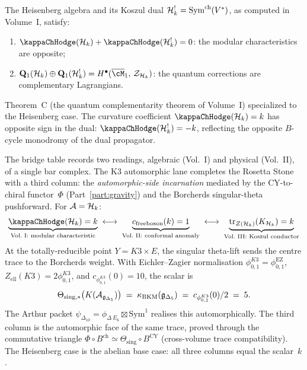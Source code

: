 \begin{proposition}
\label{prop:rosetta-complementarity}
The Heisenberg algebra and its Koszul dual
$\mathcal{H}_k^! = \mathrm{Sym}^{\mathrm{ch}}(V^*)$,
as computed in Volume~I,
satisfy:
\begin{enumerate}[label=\textup{(\roman*)}]
\item $\kappaChHodge(\cH_k) + \kappaChHodge(\cH_k^!) = 0$:
 the modular characteristics are opposite;
\item $\mathbf{Q}_1(\cH_k) \oplus \mathbf{Q}_1(\cH_k^!)
 = H^{\bullet}(\overline{\cM}_1,\, \mathcal{Z}_{\cH_k})$:
 the quantum corrections are complementary Lagrangians.
\end{enumerate}
Theorem~C \textup{(}the quantum complementarity theorem of Volume~I\textup{)} specialized to the Heisenberg case. The curvature coefficient $\kappaChHodge(\cH_k) = k$ has opposite sign in the dual: $\kappaChHodge(\cH_k^!) = -k$, reflecting the opposite $B$-cycle monodromy of the dual propagator.
\end{proposition}

\begin{remark}
\label{rem:rosetta-phi-trace-third-column}
%
%
The bridge table records two readings, algebraic (Vol.~I) and physical (Vol.~II), of a single bar complex. The K3 automorphic lane completes the Rosetta Stone with a third column: the \emph{automorphic-side incarnation} mediated by the CY-to-chiral functor~$\Phi$ (Part~\ref{part:gravity}) and the Borcherds singular-theta pushforward. For $\mathcal{A} = \mathcal{H}_k$:
\[
\underbrace{\kappaChHodge(\cH_k) = k}_{\text{Vol.~I: modular characteristic}}
\;\longleftrightarrow\;
\underbrace{c_{\mathrm{free boson}}(k) = 1}_{\text{Vol.~II: conformal anomaly}}
\;\longleftrightarrow\;
\underbrace{\mathrm{tr}_{Z(\cH_k)}(K_{\cH_k}) = k}_{\text{Vol.~III: Koszul conductor}}
\]
At the totally-reducible point $Y = K3 \times E$, the singular theta-lift sends the centre trace to the Borcherds weight. With Eichler--Zagier normalisation \(\phi_{0,1}^{K3}=\phi_{0,1}^{\mathrm{EZ}}\), \(Z_{\mathrm{ell}}(K3)=2\phi_{0,1}^{K3}\), and \(c_{\phi_{0,1}^{K3}}(0)=10\), the scalar is
\[
\Theta_{\mathrm{sing},\ast}
\bigl(K(\mathcal{A}_{\mathfrak g_{\Delta_5}})\bigr)
\;=\;
\kappa_{\mathrm{BKM}}(\mathfrak g_{\Delta_5})
\;=\;
c_{\phi_{0,1}^{K3}}(0)/2
\;=\;
5.
\]
The Arthur packet $\psi_{\Delta_{10}} = \phi_{\Delta\,E_6} \boxtimes \mathrm{Sym}^1$ realises this automorphically. The third column is the automorphic face of the same trace, proved through the commutative triangle $\Phi \circ B^{\mathrm{ch}} \simeq \Theta_{\mathrm{sing}} \circ B^{\mathrm{CY}}$ \textup{(}cross-volume trace compatibility\textup{)}. The Heisenberg case is the abelian base case: all three columns equal the scalar~$k$.
\end{remark}

